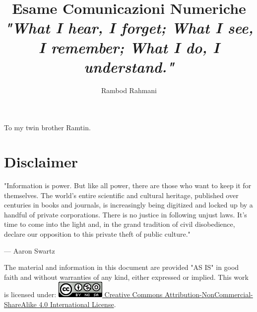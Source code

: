 \documentclass[12pt,oneside,openany]{memoir}
\title{%
	Esame Comunicazioni Numeriche\\
	\vspace{1cm}
	\large \textit{
		"What I hear, I forget;
		What I see, I remember;
		What I do, I understand."
	}}
\author{Rambod Rahmani}
\numberwithin{equation}{subsection}
\newenvironment{dedication}
{
	\afterpage{\blankpage}
	\clearpage
	\thispagestyle{empty}
	\vspace*{\stretch{1}}
	\itshape
	\raggedleft
	\afterpage{\blankpage}
}
{
	\par
	\vspace{\stretch{1}}
	\clearpage
}
\newcommand{\blankpage}
{
    \null
    \thispagestyle{empty}%
    \addtocounter{page}{-1}%
    \newpage
}
\begin{document}
\renewcommand{\rmdefault}{cmr}

\maketitle
{}

\begin{dedication}
To my twin brother Ramtin.
\end{dedication}


\newpage
{}
\tableofcontents
\afterpage{\blankpage}

\newpage
{}


\chapter{Disclaimer}
\epigraph{"Information is power. But like all power, there are those who want
to keep it for themselves. The world's entire scientific and cultural heritage,
published over centuries in books and journals, is increasingly being digitized
and locked up by a handful of private corporations. There is no justice in
following unjust laws. It's time to come into the light and, in the grand
tradition of civil disobedience, declare our opposition to this private theft
of public culture."}{--- \textup{Aaron Swartz}}

The material and information in this document are provided "AS IS" in good faith
and without warranties of any kind, either expressed or implied.
\bigbreak\noindent
This work is licensed under:
\bigbreak\noindent
\href{http://creativecommons.org/licenses/by-nc-sa/4.0/}{\includegraphics[height=\baselineskip]{images/cc_88x31.png} Creative Commons Attribution-NonCommercial-ShareAlike 4.0 International License}.

\end{document}
